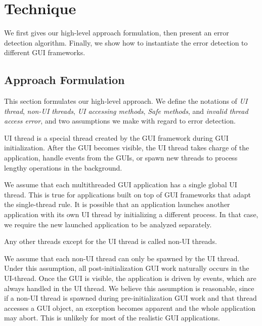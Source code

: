 \section{Technique}

We first gives our high-level approach formulation, then present
an error detection algorithm. Finally, we show how to instantiate
the error detection to different GUI frameworks.


\subsection{Approach Formulation}

This section formulates our high-level approach. We define the
notations of \textit{UI thread}, \textit{non-UI threads},
\textit{UI accessing methods},
 \textit{Safe methods}, and \textit{invalid thread access error}, and
two assumptions we make with regard to error detection.

 {UI thread
is a special thread created by the GUI framework during
GUI initialization. After the GUI becomes visible, the UI thread
takes charge of the application, handle events from the GUIs,
or spawn new threads to process lengthy operations in the background. }\vspace{1mm}

 {We assume that each multithreaded
GUI application has a single global UI thread. This is true for applications
built on top of GUI frameworks that adapt the single-thread rule. It is
possible that an application launches another application with its own UI thread
by initializing a different process. In that case, we require the new
launched application to be analyzed separately.}\vspace{1mm}

 {Any other
threads except for the UI thread is called non-UI threads.}\vspace{1mm}

 { We assume that each non-UI
thread can only be spawned by the UI thread. Under this assumption, all post-initialization
GUI work naturally occurs in the UI-thread. Once the GUI is visible, the
application is driven by events, which are always handled in the UI thread. We
believe this assumption is reasonable, since if a non-UI
thread is spawned during pre-initialization GUI work and that thread accesses
a GUI object, an exception becomes apparent and the whole application may abort. This
is unlikely for most of the realistic GUI applications.
}\vspace{1mm}

